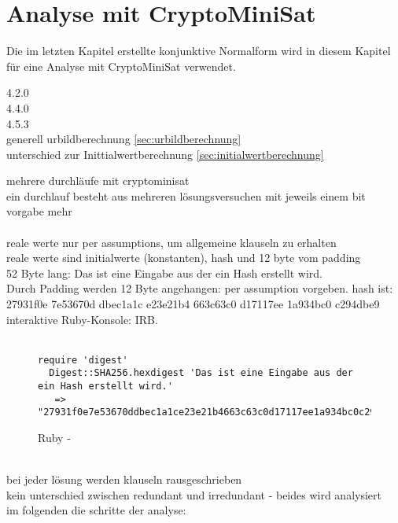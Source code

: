 \chapter{Analyse mit CryptoMiniSat}
\label{chp:analyse}

Die im letzten Kapitel erstellte konjunktive Normalform wird in diesem Kapitel für eine Analyse mit CryptoMiniSat verwendet.


4.2.0\\
4.4.0\\
4.5.3\\

generell urbildberechnung \ref{sec:urbildberechnung}\\
unterschied zur Inittialwertberechnung \ref{sec:initialwertberechnung}

mehrere durchläufe mit cryptominisat\\
ein durchlauf besteht aus mehreren lösungsversuchen mit jeweils einem bit vorgabe mehr\\
~\\
reale werte nur per assumptions, um allgemeine klauseln zu erhalten\\
reale werte sind initialwerte (konstanten), hash und 12 byte vom padding\\
52 Byte lang: Das ist eine Eingabe aus der ein Hash erstellt wird.\\
Durch Padding werden 12 Byte angehangen: per assumption vorgeben.
hash ist: 27931f0e 7e53670d dbec1a1c e23e21b4 663c63c0 d17117ee 1a934bc0 c294dbe9\\
interaktive Ruby-Konsole: IRB.\\
\\
\begin{figure}[!h]
  \centering
  \begin{lstlisting}[]
  require 'digest'
  Digest::SHA256.hexdigest 'Das ist eine Eingabe aus der ein Hash erstellt wird.'
   => "27931f0e7e53670ddbec1a1ce23e21b4663c63c0d17117ee1a934bc0c294dbe9"
  \end{lstlisting}
  \caption{Ruby - }
  \label{fig:ruby-sha256}
\end{figure}
~\\
bei jeder lösung werden klauseln rausgeschrieben\\
kein unterschied zwischen redundant und irredundant - beides wird analysiert\\
im folgenden die schritte der analyse:





